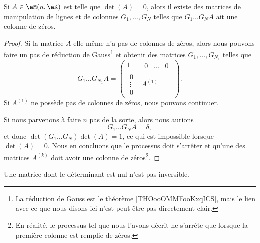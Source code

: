 \begin{proposition} \label{PROPooPMYCooAAtHsB}
	Si \( A\in \eM(n,\eK)\) est telle que \( \det(A)=0\), alors il existe des matrices de manipulation de lignes et de colonnes \( G_1,\ldots, G_N\) telles que \( G_1\ldots G_NA\) ait une colonne de zéros.
\end{proposition}

\begin{proof}
	Si la matrice \( A\) elle-même n'a pas de colonnes de zéros, alors nous pouvons faire un pas de réduction de Gauss\footnote{La réduction de Gauss est le théorème \ref{THOooOMMFooKxqICS}, mais le lien avec ce que nous disons ici n'est peut-être pas directement clair.}
	et obtenir des matrices \( G_1,\ldots,  G_{N_1}\) telles que
	\begin{equation}
		G_1\ldots G_{N_1}A=
		\begin{pmatrix}
			1                           & \begin{matrix}
				0 & \ldots & 0
			\end{matrix} \\
			\begin{matrix}
				0      \\
				\vdots \\
				0
			\end{matrix} & A^{(1)}
		\end{pmatrix}.
	\end{equation}
	Si \( A^{(1)}\) ne possède pas de colonnes de zéros, nous pouvons continuer.

	Si nous parvenons à faire \( n\) pas de la sorte, alors nous aurions
	\begin{equation}
		G_1\ldots G_NA=\delta,
	\end{equation}
	et donc \( \det(G_1\ldots G_N)\det(A)=1\), ce qui est impossible lorsque \( \det(A)=0\). Nous en concluons que le processus doit s'arrêter et qu'une des matrices \( A^{(k)}\) doit avoir une colonne de zéros\footnote{En réalité, le processus tel que nous l'avons décrit ne s'arrête que lorsque la première colonne est remplie de zéros.}.
\end{proof}

\begin{proposition}     \label{PROPooVUDJooLWjmSI}
	Une matrice dont le déterminant est nul n'est pas inversible.
\end{proposition}

